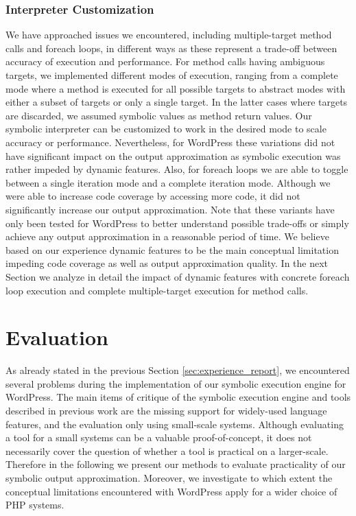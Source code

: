 \documentclass[sigconf]{acmart}
\renewcommand{\sf}[1]{\textsf{#1}}
\begin{document}
\subsubsection{Interpreter Customization}
We have approached issues we encountered, including
multiple-target method calls and foreach loops, in different ways as these
represent a trade-off between accuracy of execution and performance.
For method calls having ambiguous targets, we implemented different modes of
execution, ranging from a complete mode where a method is executed for all
possible targets to abstract modes with either a subset of targets or only a
single target. In the latter cases where targets are discarded, we assumed
symbolic values as method return values. Our symbolic interpreter can be
customized to work in the desired mode to scale accuracy or performance.
Nevertheless, for \sf{WordPress} these variations did not have significant
impact on the output approximation as symbolic execution was rather impeded by
dynamic features.
Also, for foreach loops we are able to toggle between a single iteration mode
and a complete iteration mode. Although we were able to increase code coverage
by accessing more code, it did not significantly increase our output
approximation.
Note that these variants have only been tested for \sf{WordPress} to better
understand possible trade-offs or simply achieve any output approximation in a
reasonable period of time. We believe based on our experience dynamic features
to be the main conceptual limitation impeding code coverage as well as output
approximation quality. In the next Section we analyze in detail the impact of
dynamic features with concrete foreach loop execution and complete
multiple-target execution for method calls.

\section{Evaluation}
As already stated in the previous Section \ref{sec:experience_report}, we
encountered several problems during the implementation of our symbolic
execution engine for \sf{WordPress}. The main items of critique of the symbolic
execution engine and tools described in previous work
\cite{Nguyen:2011:AFH:2190078.2190142,Nguyen:2014:BCG:2635868.2635928,Nguyen:2015:CPS:2786805.2786872,Nguyen:2015:VIS:2819009.2819140}
are the missing support for widely-used language features, and the evaluation
only using small-scale systems. Although evaluating a tool for a small systems
can be a valuable proof-of-concept, it does not necessarily cover the question
of whether a tool is practical on a larger-scale. Therefore in the following we
present our methods to evaluate practicality of our symbolic output
approximation. Moreover, we investigate to which extent the conceptual limitations encountered
with \sf{WordPress} apply for a wider choice of PHP systems.
\end{document}
